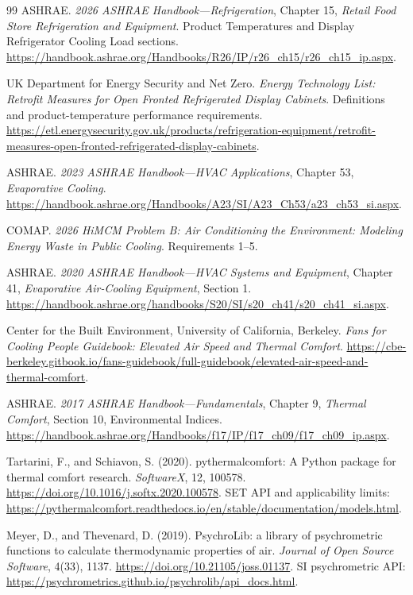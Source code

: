 \begin{thebibliography}{99}
\fontsize{9.5}{11}\selectfont
{}
\setlength{\itemsep}{0pt}
\setlength{\parskip}{0pt}
ASHRAE. \emph{2026 ASHRAE Handbook---Refrigeration},
Chapter 15, \emph{Retail Food Store Refrigeration and Equipment}.
Product Temperatures and Display Refrigerator Cooling Load sections.
\url{https://handbook.ashrae.org/Handbooks/R26/IP/r26_ch15/r26_ch15_ip.aspx}.


UK Department for Energy Security and Net Zero.
\emph{Energy Technology List: Retrofit Measures for Open Fronted Refrigerated Display Cabinets}.
Definitions and product-temperature performance requirements.
\url{https://etl.energysecurity.gov.uk/products/refrigeration-equipment/retrofit-measures-open-fronted-refrigerated-display-cabinets}.


ASHRAE. \emph{2023 ASHRAE Handbook---HVAC Applications},
Chapter 53, \emph{Evaporative Cooling}.
\url{https://handbook.ashrae.org/Handbooks/A23/SI/A23_Ch53/a23_ch53_si.aspx}.


COMAP. \emph{2026 HiMCM Problem B: Air Conditioning the Environment: Modeling Energy Waste in Public Cooling}.
Requirements 1--5.

ASHRAE. \emph{2020 ASHRAE Handbook---HVAC Systems and Equipment},
Chapter 41, \emph{Evaporative Air-Cooling Equipment}, Section 1.
\url{https://handbook.ashrae.org/handbooks/S20/SI/s20_ch41/s20_ch41_si.aspx}.


Center for the Built Environment, University of California, Berkeley.
\emph{Fans for Cooling People Guidebook: Elevated Air Speed and Thermal Comfort}.
\url{https://cbe-berkeley.gitbook.io/fans-guidebook/full-guidebook/elevated-air-speed-and-thermal-comfort}.


ASHRAE. \emph{2017 ASHRAE Handbook---Fundamentals},
Chapter 9, \emph{Thermal Comfort}, Section 10, Environmental Indices.
\url{https://handbook.ashrae.org/Handbooks/f17/IP/f17_ch09/f17_ch09_ip.aspx}.


Tartarini, F., and Schiavon, S. (2020).
pythermalcomfort: A Python package for thermal comfort research.
\emph{SoftwareX}, 12, 100578.
\url{https://doi.org/10.1016/j.softx.2020.100578}.
SET API and applicability limits:
\url{https://pythermalcomfort.readthedocs.io/en/stable/documentation/models.html}.


Meyer, D., and Thevenard, D. (2019).
PsychroLib: a library of psychrometric functions to calculate thermodynamic properties of air.
\emph{Journal of Open Source Software}, 4(33), 1137.
\url{https://doi.org/10.21105/joss.01137}.
SI psychrometric API:
\url{https://psychrometrics.github.io/psychrolib/api_docs.html}.



\end{thebibliography}
